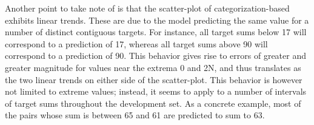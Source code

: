 \documentclass[twocolumn]{article}
\begin{document}
Another point to take note of is that the scatter-plot of categorization-based exhibits linear trends.
These are due to the model predicting the same value for a number of distinct contiguous targets.
For instance, all target sums below 17 will correspond to a prediction of 17, whereas all target sums above 90 will correspond to a prediction of 90.
This behavior gives rise to errors of greater and greater magnitude for values near the extrema 0 and 2N, and thus translates as the two linear trends on either side of the scatter-plot.
This behavior is however not limited to extreme values; instead, it seems to apply to a number of intervals of target sums throughout the development set.
As a concrete example, most of the pairs whose sum is between 65 and 61 are predicted to sum to 63.

\begin{table}%
    \centering
    \qquad
    \caption{\label{tab:topo} Topographic similarity scores}
\end{table}
\end{document}
